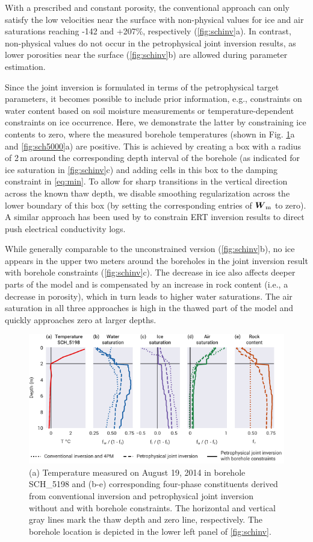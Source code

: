 \documentclass[extra]{gji}
\begin{document}
With a prescribed and constant porosity, the conventional approach can only satisfy the low velocities near the surface with non-physical values for ice and air saturations reaching -142 and +207\%, respectively (\autoref{fig:schinv}a).
In contrast, non-physical values do not occur in the petrophysical joint inversion results, as lower porosities near the surface (\autoref{fig:schinv}b) are allowed during parameter estimation.

Since the joint inversion is formulated in terms of the petrophysical target parameters, it becomes possible to include prior information, e.g., constraints on water content based on soil moisture measurements or temperature-dependent constraints on ice occurrence.
Here, we demonstrate the latter by constraining ice contents to zero, where the measured borehole  temperatures (shown in Fig. \ref{fig:sch5198}a and \ref{fig:sch5000}a) are positive.
This is achieved by creating a box with a radius of 2\,m around the corresponding depth interval of the borehole (as indicated for ice saturation in \autoref{fig:schinv}c) and adding cells in this box to the damping constraint in \autoref{eq:min}.
To allow for sharp transitions in the vertical direction across the known thaw depth, we disable smoothing regularization across the lower boundary of this box (by setting the corresponding entries of $\mitbf{W}_\text{m}$ to zero).
A similar approach has been used by \cite{Wunderlich2018} to constrain ERT inversion results to direct push electrical conductivity logs.

While generally comparable to the unconstrained version (\autoref{fig:schinv}b), no ice appears in the upper two meters around the boreholes in the joint inversion result with borehole constraints (\autoref{fig:schinv}c).
The decrease in ice also affects deeper parts of the model and is compensated by an increase in rock content (i.e., a decrease in porosity), which in turn leads to higher water saturations.
The air saturation in all three approaches is high in the thawed part of the model and quickly approaches zero at larger depths.

\begin{figure}
 \centering
 \includegraphics[width=.75\textwidth]{./Fig6_two_columns}
 \caption{(a) Temperature measured on August 19, 2014 in borehole SCH\_5198 and (b-e) corresponding four-phase constituents derived from conventional inversion and petrophysical joint inversion without and with borehole constraints. The horizontal and vertical gray lines mark the thaw depth and zero line, respectively. The borehole location is depicted in the lower left panel of \autoref{fig:schinv}.}
 \label{fig:sch5198}
\end{figure}
\end{document}
